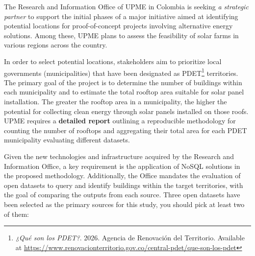 \documentclass[12pt]{article}
\begin{document}
The Research and Information Office of UPME in Colombia is seeking \textit{a strategic partner} to support the initial phases of a major initiative aimed at identifying potential locations for proof-of-concept projects involving alternative energy solutions. Among these, UPME plans to assess the feasibility of solar farms in various regions across the country.

In order to select potential locations, stakeholders aim to prioritize local governments (municipalities) that have been designated as PDET\footnote{\textit{¿Qué son los PDET?}. 2026. Agencia de Renovación del Territorio. Available at \url{https://www.renovacionterritorio.gov.co/central-pdet/que-son-los-pdet}} territories. The primary goal of the project is to determine the number of buildings within each municipality and to estimate the total rooftop area suitable for solar panel installation. The greater the rooftop area in a municipality, the higher the potential for collecting clean energy through solar panels installed on those roofs. UPME requires a \textbf{detailed report} outlining a reproducible methodology for counting the number of rooftops and aggregating their total area for each PDET municipality evaluating different datasets.

Given the new technologies and infrastructure acquired by the Research and Information Office, a key requirement is the application of NoSQL solutions in the proposed methodology. Additionally, the Office mandates the evaluation of open datasets to query and identify buildings within the target territories, with the goal of comparing the outputs from each source. Three open datasets have been selected as the primary sources for this study, you should pick at least two of them:
\end{document}
